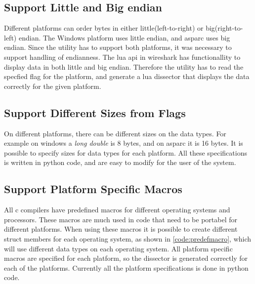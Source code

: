 \subsection{Support Little and Big \Gls{endian}}
Different platforms can order bytes in either little(left-to-right) or 
big(right-to-left) \gls{endian}. The \Gls{Windows} platform uses little \gls{endian}, and \gls{asparc} 
uses big \gls{endian}. Since the \gls{utility} has to support both platforms, it was 
necessary to support handling of \gls{endianness}. The \Gls{lua} \gls{api} in \Gls{wireshark} has 
functionallity to display data in both little and big \gls{endian}. Therefore the 
\gls{utility} has to read the specfied flag for the platform, and generate a \Gls{lua} 
\gls{dissector} that displays the data correctly for the given platform.

\subsection{Support Different Sizes from Flags}
On different platforms, there can be different sizes on the data types. For 
example on windows a \emph{long double} is 8 bytes, and on \gls{asparc} it is 16 
bytes. It is possible to specify sizes for data types for each platform. All 
these specifications is written in \Gls{python} code, and are easy to modify for the 
user of the system.

\subsection{Support Platform Specific Macros}
All \Gls{c} compilers have predefined macros for different operating systems and 
processors. These macros are much used in code that need to be portabel for 
different platforms. When using these macros it is possible to create 
different \gls{struct} \glspl{member} for each operating system, as shown in 
\autoref{code:predefmacro}, which will use different data types on each 
operating system. All platform specific macros are specified for each 
platform, so the \gls{dissector} is generated correctly for each of the platforms. 
Currently all the platform specifications is done in \Gls{python} code.



